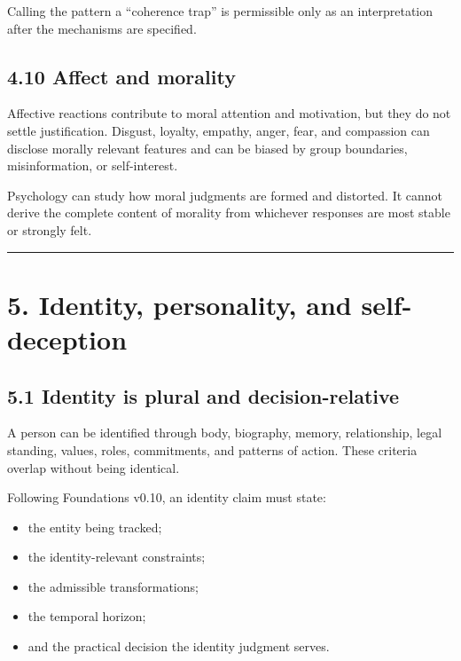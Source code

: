 \documentclass[
  11pt,
]{article}
\providecommand{\tightlist}{%
  \setlength{\itemsep}{0pt}\setlength{\parskip}{0pt}}
\begin{document}
Calling the pattern a ``coherence trap'' is permissible only as an
interpretation after the mechanisms are specified.

\subsection{4.10 Affect and morality}\label{affect-and-morality}

Affective reactions contribute to moral attention and motivation, but
they do not settle justification. Disgust, loyalty, empathy, anger,
fear, and compassion can disclose morally relevant features and can be
biased by group boundaries, misinformation, or self-interest.

Psychology can study how moral judgments are formed and distorted. It
cannot derive the complete content of morality from whichever responses
are most stable or strongly felt.

\begin{center}\rule{0.5\linewidth}{0.5pt}\end{center}

\section{5. Identity, personality, and
self-deception}\label{identity-personality-and-self-deception}

\subsection{5.1 Identity is plural and
decision-relative}\label{identity-is-plural-and-decision-relative}

A person can be identified through body, biography, memory,
relationship, legal standing, values, roles, commitments, and patterns
of action. These criteria overlap without being identical.

Following Foundations v0.10, an identity claim must state:

\begin{itemize}
\tightlist
\item
  the entity being tracked;
\item
  the identity-relevant constraints;
\item
  the admissible transformations;
\item
  the temporal horizon;
\item
  and the practical decision the identity judgment serves.
\end{itemize}
\end{document}
